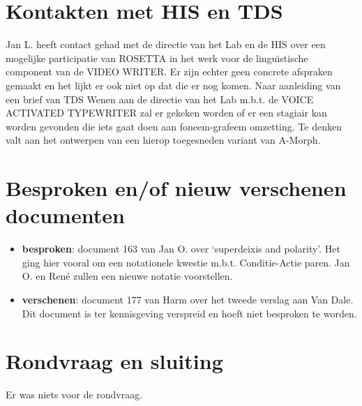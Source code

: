 \begin{itemize}
\section {Kontakten met HIS en TDS}
Jan L. heeft contact gehad met de directie van het Lab en de HIS over een 
mogelijke participatie van 
ROSETTA in het werk voor de lingu\"{\i}stische component van de VIDEO WRITER.
Er zijn echter geen concrete afspraken gemaakt en het lijkt er ook niet op dat 
die er nog komen.
Naar aanleiding van een brief van TDS Wenen aan de directie van het Lab m.b.t.  
de VOICE ACTIVATED TYPEWRITER zal er gekeken worden of er een stagiair kan 
worden gevonden die iets gaat doen aan foneem-grafeem omzetting. Te denken 
valt aan het ontwerpen van een hierop toegesneden variant van A-Morph.
\section {Besproken en/of nieuw verschenen documenten}
\begin{itemize}
  \item {\bf besproken}: document 163 van Jan O. over `superdeixis and 
        polarity'. Het
        ging hier vooral om een notationele kwestie m.b.t. Conditie-Actie 
        paren. Jan O. en Ren\'{e} zullen een nieuwe notatie voorstellen.
  \item {\bf verschenen}: document 177 van Harm over het tweede verslag aan
        Van Dale. Dit document is ter kennisgeving verspreid en hoeft niet 
        besproken te worden.
\end{itemize}
\section {Rondvraag en sluiting}
Er was niets voor de rondvraag.
\end{itemize}

